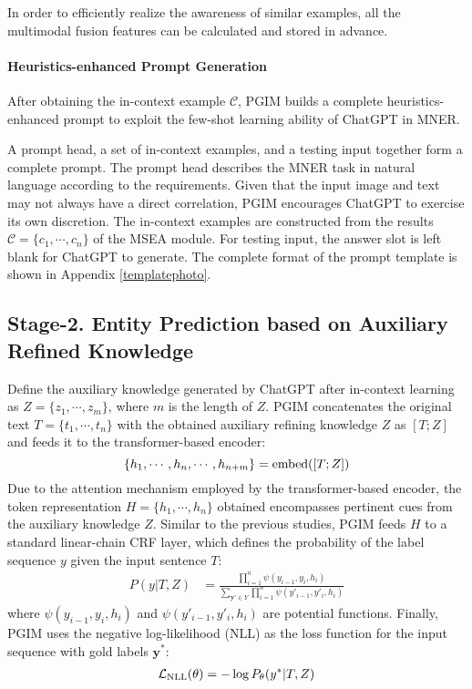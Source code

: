 \documentclass[11pt]{article}
\newcommand{\mcL}{\mathcal{L}}
\def\vy{{\bm{y}}}
\begin{document}
In order to efficiently realize the awareness of similar examples, all the multimodal fusion features can be calculated and stored in advance.

\paragraph{Heuristics-enhanced Prompt Generation}
After obtaining the in-context example $\mathcal{C}$, PGIM builds a complete heuristics-enhanced prompt to exploit the few-shot learning ability of ChatGPT in MNER. 

A prompt head, a set of in-context examples, and a testing input together form a complete prompt. The prompt head describes the MNER task in natural language according to the requirements. 
Given that the input image and text may not always have a direct correlation, PGIM encourages ChatGPT to exercise its own discretion. 
The in-context examples are constructed from the results $\mathcal{C} = \{c_1, \cdots, c_n\}$ of the MSEA module. For testing input, the answer slot is left blank for ChatGPT to generate.
The complete format of the prompt template is shown in Appendix \ref{templatephoto}. 

\subsection{Stage-2. Entity Prediction based on Auxiliary Refined Knowledge} \label{sec:3.3}
Define the auxiliary knowledge generated by ChatGPT after in-context learning as $Z = \{z_1, \cdots, z_m\}$, where $m$ is the length of $Z$. 
PGIM concatenates the original text $T = \{t_1, \cdots, t_n\}$ with the obtained auxiliary refining knowledge $Z$ as $[T;Z]$ and feeds it to the transformer-based encoder:
\vspace{-3pt}
\begin{displaymath}
\{h_1,\cdots,h_n,\cdots,h_{n+m}\} = \text{embed} ([T;Z])
\vspace{-3pt}
\end{displaymath}
Due to the attention mechanism employed by the transformer-based encoder, the token representation $ H =\{h_1,\cdots,h_n\}$ obtained encompasses pertinent cues from the auxiliary knowledge $Z$. Similar to the previous studies, PGIM feeds $H$ to a standard linear-chain CRF layer, which defines the probability of the label sequence $y$ given the input sentence $T$:
\begin{align}
    P(y|T,Z) &= \frac{\prod\limits_{i=1}^{n} \psi(y_{i-1}, y_i, h_i)}{\sum\limits_{\vy' \in Y} \prod\limits_{i=1}^{n} \psi(y'_{i-1}, y'_i, h_i)}\nonumber
\end{align}
where $\psi(y_{i-1}, y_i, h_i)$ and $\psi(y'_{i-1}, y'_i, h_i)$ are potential functions. Finally, PGIM uses the negative log-likelihood (NLL) as the loss function for the input sequence with gold labels $\vy^*$:
\vspace{-3pt}
\begin{align}
\mcL_{\text{NLL}}(\theta) = - \log P_{\theta}(y^*|T,Z) \label{eq:nll_loss}\nonumber
\vspace{-3pt}
\end{align}
\end{document}
